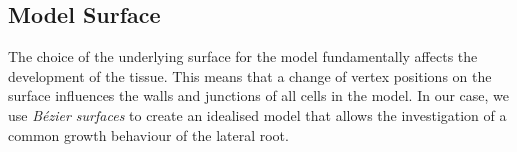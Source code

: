 \documentclass[11pt,a4paper, final]{article}
\begin{document}
\subsection{Model Surface}
\noindent
The choice of the underlying surface for the model fundamentally affects the development of the tissue. This means that a change of vertex positions on the surface influences the walls and junctions of all cells in the model. In our case, we use \textit{B\'ezier surfaces} to create an idealised model that allows the investigation of a common growth behaviour of the lateral root.
\end{document}
